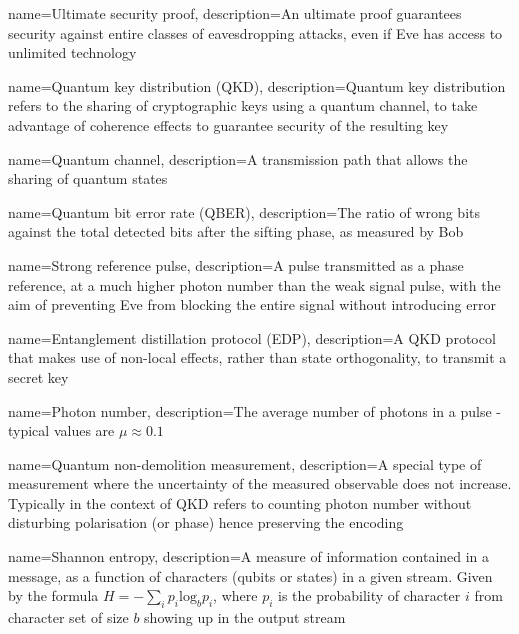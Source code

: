  {
name={Ultimate security proof},
description={An ultimate proof guarantees security against entire classes of eavesdropping attacks, even if Eve has access to unlimited technology}
}

 {name={Quantum key distribution (QKD)},
description={Quantum key distribution refers to the sharing of cryptographic keys using a quantum channel, to take advantage of coherence effects to guarantee security of the resulting key}
}

 {
name={Quantum channel},
description={A transmission path that allows the sharing of quantum states}
}

 {
name={Quantum bit error rate (QBER)},
description={The ratio of wrong bits against the total detected bits after the sifting phase, as measured by Bob}
}

 {
name={Strong reference pulse},
description={A pulse transmitted as a phase reference, at a much higher photon number than the weak signal pulse, with the aim of preventing Eve from blocking the entire signal without introducing error}
}

 {
name={Entanglement distillation protocol (EDP)},
description={A QKD protocol that makes use of non-local effects, rather than state orthogonality, to transmit a secret key}
}

 {
name={Photon number},
description={The average number of photons in a pulse - typical values are $\mu \approx 0.1$}
}

 {
name={Quantum non-demolition measurement},
description={A special type of measurement where the uncertainty of the measured observable does not increase. Typically in the context of QKD refers to counting photon number without disturbing polarisation (or phase) hence preserving the encoding}
}

 {
name={Shannon entropy},
description={A measure of information contained in a message, as a function of characters (qubits or states) in a given stream. Given by the formula $H = -\sum_i p_i \mathrm{log}_b p_i$, where $p_i$ is the probability of character $i$ from character set of size $b$ showing up in the output stream}
}

